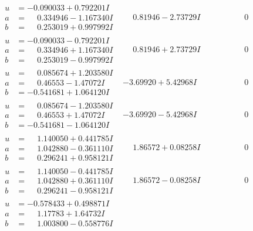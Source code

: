 \documentclass[1p]{elsarticle_modified}
\theoremstyle{definition}
\begin{document}
$$\begin{array}{c|c|c}
\begin{aligned}
u &= -0.090033 + 0.792201 I \\
a &= \phantom{-}0.334946 - 1.167340 I \\
b &= \phantom{-}0.253019 + 0.997992 I\end{aligned}
 & \phantom{-}0.81946 - 2.73729 I & \phantom{-0.000000 } 0 \\ \hline\begin{aligned}
u &= -0.090033 - 0.792201 I \\
a &= \phantom{-}0.334946 + 1.167340 I \\
b &= \phantom{-}0.253019 - 0.997992 I\end{aligned}
 & \phantom{-}0.81946 + 2.73729 I & \phantom{-0.000000 } 0 \\ \hline\begin{aligned}
u &= \phantom{-}0.085674 + 1.203580 I \\
a &= \phantom{-}0.46553 - 1.47072 I \\
b &= -0.541681 + 1.064120 I\end{aligned}
 & -3.69920 + 5.42968 I & \phantom{-0.000000 } 0 \\ \hline\begin{aligned}
u &= \phantom{-}0.085674 - 1.203580 I \\
a &= \phantom{-}0.46553 + 1.47072 I \\
b &= -0.541681 - 1.064120 I\end{aligned}
 & -3.69920 - 5.42968 I & \phantom{-0.000000 } 0 \\ \hline\begin{aligned}
u &= \phantom{-}1.140050 + 0.441785 I \\
a &= \phantom{-}1.042880 - 0.361110 I \\
b &= \phantom{-}0.296241 + 0.958121 I\end{aligned}
 & \phantom{-}1.86572 + 0.08258 I & \phantom{-0.000000 } 0 \\ \hline\begin{aligned}
u &= \phantom{-}1.140050 - 0.441785 I \\
a &= \phantom{-}1.042880 + 0.361110 I \\
b &= \phantom{-}0.296241 - 0.958121 I\end{aligned}
 & \phantom{-}1.86572 - 0.08258 I & \phantom{-0.000000 } 0 \\ \hline\begin{aligned}
u &= -0.578433 + 0.498871 I \\
a &= \phantom{-}1.17783 + 1.64732 I \\
b &= \phantom{-}1.003800 - 0.558776 I\end{aligned}

\end{array}$$
\end{document}
